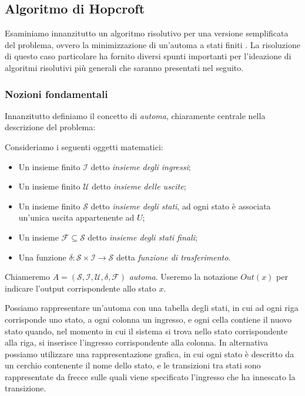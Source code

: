 \subsection{Algoritmo di Hopcroft}
Esaminiamo innanzitutto un algoritmo risolutivo per una versione semplificata del problema, ovvero la minimizzazione di un'automa a stati finiti \cite{hopcroft}. La risoluzione di questo caso particolare ha fornito diversi spunti importanti per l'ideazione di algoritmi risolutivi più generali che saranno presentati nel seguito.

\newcommand{\automata}{$\mathcal{A} = (\mathcal{S},\mathcal{I},\mathcal{U},\mathcal{F},\delta)$ }
\newcommand{\argsautomata}{$\mathcal{S},\mathcal{I},\mathcal{U},\mathcal{F},\delta$ }

\subsubsection{Nozioni fondamentali}
Innanzitutto definiamo il concetto di \emph{automa}, chiaramente centrale nella descrizione del problema:
\begin{definition}
    Consideriamo i seguenti oggetti matematici:
    \begin{itemize}
        \item Un insieme finito $\mathcal{I}$ detto \emph{insieme degli ingressi};
        \item Un insieme finito $\mathcal{U}$ detto \emph{insieme delle uscite};
        \item Un insieme finito $\mathcal{S}$ detto \emph{insieme degli stati}, ad ogni stato è associata un'unica uscita appartenente ad $U$;
        \item Un insieme $\mathcal{F} \subseteq \mathcal{S}$ detto \emph{insieme degli stati finali};
        \item Una funzione $\delta: \mathcal{S} \times \mathcal{I} \to \mathcal{S}$ detta \emph{funzione di trasferimento}.
    \end{itemize}
    Chiameremo $A = (\mathcal{S},\mathcal{I},\mathcal{U},\delta,\mathcal{F})$ \emph{automa}. Useremo la notazione $Out(x)$ per indicare l'output corrispondente allo stato $x$.
\end{definition}
Possiamo rappresentare un'automa con una tabella degli stati, in cui ad ogni riga corrisponde uno stato, a ogni colonna un ingresso, e ogni cella contiene il nuovo stato quando, nel momento in cui il sistema si trova nello stato corrispondente alla riga, si inserisce l'ingresso corrispondente alla colonna. In alternativa possiamo utilizzare una rappresentazione grafica, in cui ogni stato è descritto da un cerchio contenente il nome dello stato, e le transizioni tra stati sono rappresentate da frecce sulle quali viene specificato l'ingresso che ha innescato la transizione.

